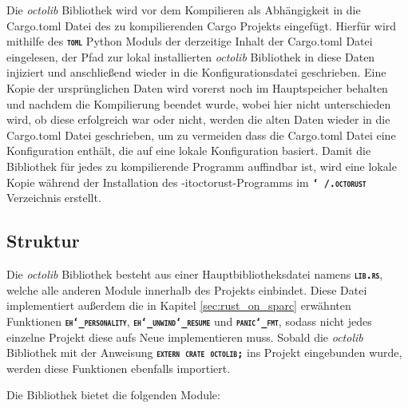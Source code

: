 Die \textit{octolib} Bibliothek wird vor dem Kompilieren als Abhängigkeit in die Cargo.toml Datei des
zu kompilierenden Cargo Projekts eingefügt.
Hierfür wird mithilfe des \texttt{\textsc{\textbf{toml}}} Python Moduls der derzeitige Inhalt der Cargo.toml Datei
eingelesen, der Pfad zur lokal installierten \textit{octolib} Bibliothek in diese Daten injiziert und anschließend 
wieder in die Konfigurationsdatei geschrieben.
Eine Kopie der ursprünglichen Daten wird vorerst noch im Hauptspeicher behalten und
nachdem die Kompilierung beendet wurde, wobei hier nicht unterschieden wird, ob diese erfolgreich war oder nicht,
werden die alten Daten wieder in die Cargo.toml Datei geschrieben,
um zu vermeiden dass die Cargo.toml Datei eine Konfiguration enthält, die auf eine lokale Konfiguration basiert.
Damit die Bibliothek für jedes zu kompilierende Programm auffindbar ist,
wird eine lokale Kopie während der Installation des \text-it{octorust}-Programms im
\texttt{\textsc{\textbf{\char`~/.octorust}}} Verzeichnis erstellt.

\subsection{Struktur}

Die \textit{octolib} Bibliothek besteht aus einer Hauptbibliotheksdatei namens \texttt{\textsc{\textbf{lib.rs}}},
welche alle anderen Module innerhalb des Projekts einbindet. Diese
Datei implementiert außerdem die in Kapitel \ref{sec:rust_on_sparc} erwähnten Funktionen
\texttt{\textsc{\textbf{eh\char`_personality}}}, \texttt{\textsc{\textbf{eh\char`_unwind\char`_resume}}} und
\texttt{\textsc{\textbf{panic\char`_fmt}}}, sodass nicht jedes einzelne Projekt diese aufs Neue implementieren muss. 
Sobald die \textit{octolib} Bibliothek mit der Anweisung \texttt{\textsc{\textbf{extern crate octolib;}}}
ins Projekt eingebunden wurde, werden diese Funktionen ebenfalls importiert.

Die Bibliothek bietet die folgenden Module:


